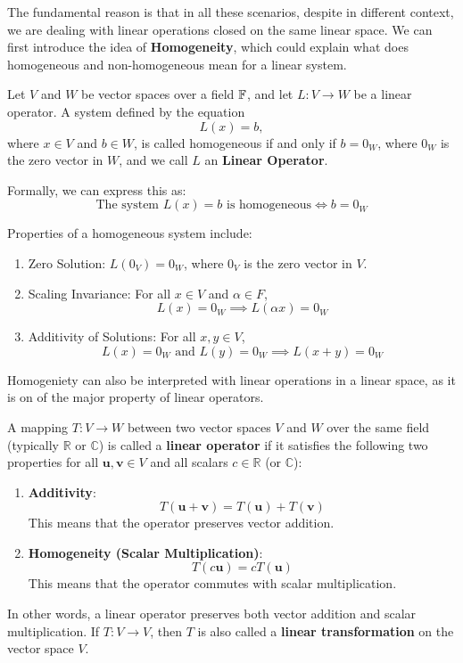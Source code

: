 \documentclass[12pt,a4paper]{article}
\begin{document}
The fundamental reason is that in all these scenarios, despite in different context, we are dealing with linear operations closed on the same linear space. We can first introduce the idea of \textbf{Homogeneity}, which could explain what does homogeneous and non-homogeneous mean for a linear system.
\begin{definition}
Let $V$ and $W$ be vector spaces over a field $\mathbb{F}$, and let $L : V \to W$ be a linear operator. A system defined by the equation
\[
L(x) = b,
\]
where $x \in V$ and $b \in W$, is called homogeneous if and only if $b = 0_W$, where $0_W$ is the zero vector in $W$, and we call $L$ an \textbf{Linear Operator}.

Formally, we can express this as:
\[
\text{The system } L(x) = b \text{ is homogeneous} \iff b = 0_W
\]

Properties of a homogeneous system include:

\begin{enumerate}
    \item Zero Solution: $L(0_V) = 0_W$, where $0_V$ is the zero vector in $V$.
    \item Scaling Invariance: For all $x \in V$ and $\alpha \in F$,
          \[
          L(x) = 0_W \implies L(\alpha x) = 0_W
          \]
    \item Additivity of Solutions: For all $x, y \in V$,
          \[
          L(x) = 0_W \text{ and } L(y) = 0_W \implies L(x + y) = 0_W
          \]
\end{enumerate}
\end{definition}

Homogeniety can also be interpreted with linear operations in a linear space, as it is on of the major property of linear operators.
\begin{definition}
A mapping $T: V \to W$ between two vector spaces $V$ and $W$ over the same field (typically $\mathbb{R}$ or $\mathbb{C}$) is called a \textbf{linear operator} if it satisfies the following two properties for all $\mathbf{u}, \mathbf{v} \in V$ and all scalars $c \in \mathbb{R}$ (or $\mathbb{C}$):
\begin{enumerate}
    \item \textbf{Additivity}: 
    \[ T(\mathbf{u} + \mathbf{v}) = T(\mathbf{u}) + T(\mathbf{v}) \]
    This means that the operator preserves vector addition.
    
    \item \textbf{Homogeneity (Scalar Multiplication)}: 
    \[ T(c \mathbf{u}) = c T(\mathbf{u}) \]
    This means that the operator commutes with scalar multiplication.
\end{enumerate}

In other words, a linear operator preserves both vector addition and scalar multiplication. If $T: V \to V$, then $T$ is also called a \textbf{linear transformation} on the vector space $V$.
\end{definition}
\end{document}
